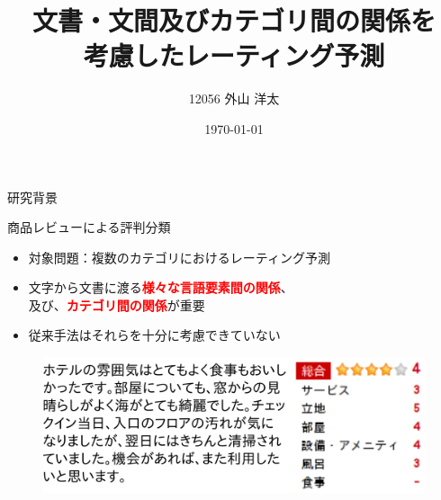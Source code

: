 \documentclass[aspectratio=43,unicode,10pt]{beamer}
\title{文書・文間及びカテゴリ間の関係を\\考慮したレーティング予測}
\institute{知能数理研究室}
\author{12056 外山 洋太}
\date{\today}
\newcommand{\fire}[1]{\textcolor{red}{\textbf{#1}}}
\begin{document}
\begin{frame}
\titlepage
\end{frame}

\begin{frame}{研究背景}{}
  \begin{block}{商品レビューによる評判分類}
    \begin{itemize}
      \item 対象問題：複数のカテゴリにおけるレーティング予測
      \item 文字から文書に渡る\fire{様々な言語要素間の関係}、 \\
            及び、\fire{カテゴリ間の関係}が重要
      \item 従来手法はそれらを十分に考慮できていない
    \end{itemize}
  \end{block}
  \begin{figure}
    \includegraphics[width=0.7\linewidth]{fig/review.png}
  \end{figure}
\end{frame}
\end{document}
